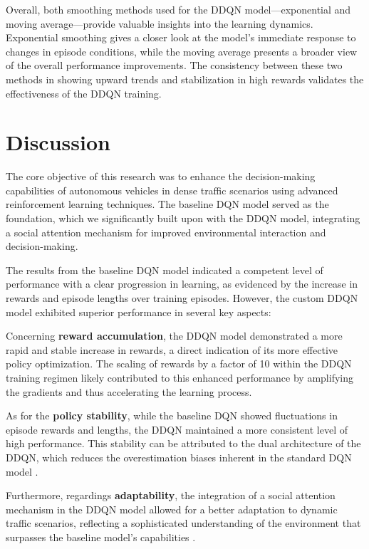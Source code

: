 \documentclass{article}
\begin{document}
Overall, both smoothing methods used for the DDQN model—exponential and moving average—provide valuable insights into the learning dynamics. Exponential smoothing gives a closer look at the model's immediate response to changes in episode conditions, while the moving average presents a broader view of the overall performance improvements. The consistency between these two methods in showing upward trends and stabilization in high rewards validates the effectiveness of the DDQN training.


\section{Discussion}

The core objective of this research was to enhance the decision-making capabilities of autonomous vehicles in dense traffic scenarios using advanced reinforcement learning techniques. The baseline DQN model served as the foundation, which we significantly built upon with the DDQN model, integrating a social attention mechanism for improved environmental interaction and decision-making.

The results from the baseline DQN model indicated a competent level of performance with a clear progression in learning, as evidenced by the increase in rewards and episode lengths over training episodes. However, the custom DDQN model exhibited superior performance in several key aspects:

Concerning \textbf{reward accumulation}, the DDQN model demonstrated a more rapid and stable increase in rewards, a direct indication of its more effective policy optimization. The scaling of rewards by a factor of 10 within the DDQN training regimen likely contributed to this enhanced performance by amplifying the gradients and thus accelerating the learning process.

As for the \textbf{policy stability}, while the baseline DQN showed fluctuations in episode rewards and lengths, the DDQN maintained a more consistent level of high performance. This stability can be attributed to the dual architecture of the DDQN, which reduces the overestimation biases inherent in the standard DQN model \citep{DBLP:journals/corr/HasseltGS15}.

Furthermore, regardings \textbf{adaptability}, the integration of a social attention mechanism in the DDQN model allowed for a better adaptation to dynamic traffic scenarios, reflecting a sophisticated understanding of the environment that surpasses the baseline model's capabilities \citep{leurent2019social}.
\end{document}
